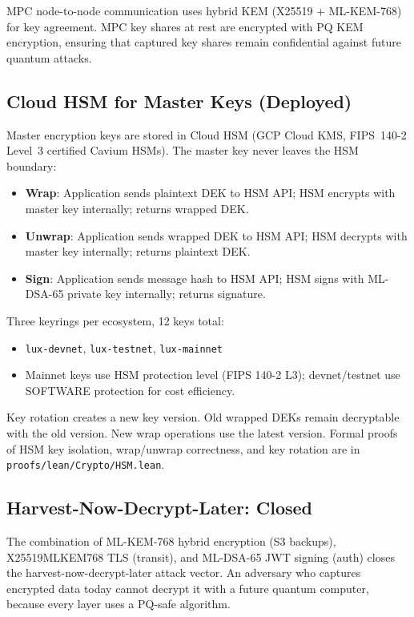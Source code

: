\documentclass[11pt,a4paper]{article}
\begin{document}
MPC node-to-node communication uses hybrid KEM (X25519 + ML-KEM-768)
for key agreement. MPC key shares at rest are encrypted with PQ KEM
encryption, ensuring that captured key shares remain confidential
against future quantum attacks.

\subsection{Cloud HSM for Master Keys (Deployed)}

Master encryption keys are stored in Cloud HSM (GCP Cloud KMS,
FIPS~140-2 Level~3 certified Cavium HSMs). The master key never
leaves the HSM boundary:

\begin{itemize}[nosep]
  \item \textbf{Wrap}: Application sends plaintext DEK to HSM API;
    HSM encrypts with master key internally; returns wrapped DEK.
  \item \textbf{Unwrap}: Application sends wrapped DEK to HSM API;
    HSM decrypts with master key internally; returns plaintext DEK.
  \item \textbf{Sign}: Application sends message hash to HSM API;
    HSM signs with ML-DSA-65 private key internally; returns signature.
\end{itemize}

Three keyrings per ecosystem, 12 keys total:
\begin{itemize}[nosep]
  \item \texttt{lux-devnet}, \texttt{lux-testnet}, \texttt{lux-mainnet}
  \item Mainnet keys use HSM protection level (FIPS 140-2 L3);
    devnet/testnet use SOFTWARE protection for cost efficiency.
\end{itemize}

Key rotation creates a new key version. Old wrapped DEKs remain
decryptable with the old version. New wrap operations use the latest
version. Formal proofs of HSM key isolation, wrap/unwrap correctness,
and key rotation are in \texttt{proofs/lean/Crypto/HSM.lean}.

\subsection{Harvest-Now-Decrypt-Later: Closed}

The combination of ML-KEM-768 hybrid encryption (S3 backups),
X25519MLKEM768 TLS (transit), and ML-DSA-65 JWT signing (auth)
closes the harvest-now-decrypt-later attack vector. An adversary
who captures encrypted data today cannot decrypt it with a future
quantum computer, because every layer uses a PQ-safe algorithm.
\end{document}
